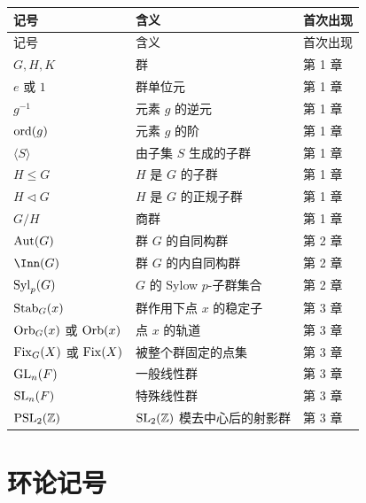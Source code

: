 \begin{longtable}{p{}p{}p{}}
\toprule
记号 & 含义 & 首次出现 \\
\midrule
\endfirsthead
\toprule
记号 & 含义 & 首次出现 \\
\midrule
\endhead
$G,H,K$ & 群 & 第 1 章 \\
$e$ 或 $1$ & 群单位元 & 第 1 章 \\
$g^{-1}$ & 元素 $g$ 的逆元 & 第 1 章 \\
$\mathrm{ord}(g)$ & 元素 $g$ 的阶 & 第 1 章 \\
$\langle S\rangle$ & 由子集 $S$ 生成的子群 & 第 1 章 \\
$H\le G$ & $H$ 是 $G$ 的子群 & 第 1 章 \\
$H\triangleleft G$ & $H$ 是 $G$ 的正规子群 & 第 1 章 \\
$G/H$ & 商群 & 第 1 章 \\
$\mathrm{Aut}(G)$ & 群 $G$ 的自同构群 & 第 2 章 \\
$\Inn(G)$ & 群 $G$ 的内自同构群 & 第 2 章 \\
$\operatorname{Syl}_p(G)$ & $G$ 的 Sylow $p$-子群集合 & 第 2 章 \\
$\operatorname{Stab}_G(x)$ & 群作用下点 $x$ 的稳定子 & 第 3 章 \\
$\operatorname{Orb}_G(x)$ 或 $\operatorname{Orb}(x)$ & 点 $x$ 的轨道 & 第 3 章 \\
$\operatorname{Fix}_G(X)$ 或 $\operatorname{Fix}(X)$ & 被整个群固定的点集 & 第 3 章 \\
$\mathrm{GL}_n(F)$ & 一般线性群 & 第 3 章 \\
$\mathrm{SL}_n(F)$ & 特殊线性群 & 第 3 章 \\
$\mathrm{PSL}_2(\mathbb{Z})$ & $\mathrm{SL}_2(\mathbb{Z})$ 模去中心后的射影群 & 第 3 章 \\
\bottomrule
\end{longtable}

\section{环论记号}

